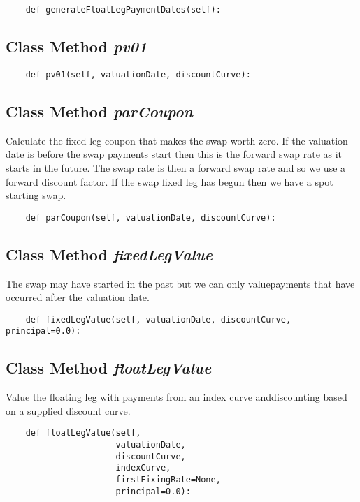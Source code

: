 \documentclass[twoside,11pt]{book}
\begin{document}
\begin{lstlisting}
    def generateFloatLegPaymentDates(self):
\end{lstlisting}

\subsection{Class Method {\it pv01}}


\begin{lstlisting}
    def pv01(self, valuationDate, discountCurve):
\end{lstlisting}

\subsection{Class Method {\it parCoupon}}
Calculate the fixed leg coupon that makes the swap worth zero. If the valuation date is before the swap payments start then this is the forward swap rate as it starts in the future. The swap rate is then a forward swap rate and so we use a forward discount factor. If the swap fixed leg has begun then we have a spot starting swap. 

\begin{lstlisting}
    def parCoupon(self, valuationDate, discountCurve):
\end{lstlisting}

\subsection{Class Method {\it fixedLegValue}}
The swap may have started in the past but we can only valuepayments that have occurred after the valuation date. 

\begin{lstlisting}
    def fixedLegValue(self, valuationDate, discountCurve, principal=0.0):
\end{lstlisting}

\subsection{Class Method {\it floatLegValue}}
Value the floating leg with payments from an index curve anddiscounting based on a supplied discount curve. 

\begin{lstlisting}
    def floatLegValue(self,
                      valuationDate,
                      discountCurve,
                      indexCurve,
                      firstFixingRate=None,
                      principal=0.0):
\end{lstlisting}
\end{document}
